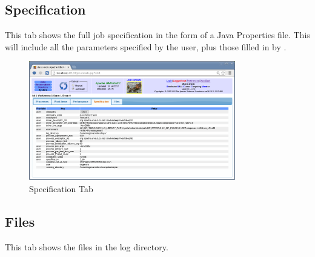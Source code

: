    \subsection{Specification}
   This tab shows the full job specification in the form of a Java Properties
   file.  This will include all the parameters specified by the user, plus those
   filled in by {\DUCC}.
    
    \begin{figure}[ht!]
    \centering
    \includegraphics[width=90mm]{images/ducc-webserver/Job-Details-Specification.png}
    \caption{Specification Tab}
    \end{figure}  
    
   \subsection{Files}
   This tab shows the files in the log directory.
